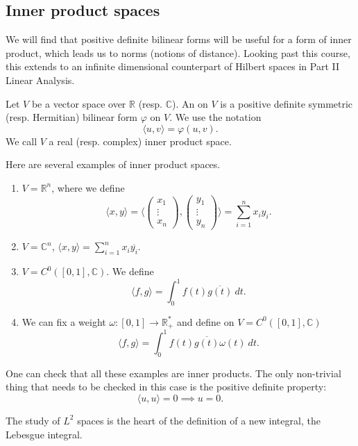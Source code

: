 \documentclass[a4paper]{scrartcl}
\begin{document}
\subsection{Inner product spaces}
We will find that positive definite bilinear forms will be useful for a form of inner product, which leads us to norms (notions of distance). Looking past this course, this extends to an infinite dimensional counterpart of Hilbert spaces in Part II Linear Analysis.
\begin{definition}
      Let $V$ be a vector space over $\mathbb{R}$ (resp. $\mathbb{C}$). An  on $V$ is a positive definite symmetric (resp. Hermitian) bilinear form $\varphi$ on $V$. We use the notation 
      \[\langle u ,v \rangle =\varphi \left(u,v\right).\]
      We call $V$ a real (resp. complex) inner product space.
\end{definition}
\begin{example}
     Here are several examples of inner product spaces.
      \begin{enumerate}
           \item $V=\mathbb{R}^{n} $, where we define 
           \[\langle x ,y \rangle =\langle \begin{pmatrix}
           x_1\\\vdots\\x_n
           \end{pmatrix}, \begin{pmatrix}
           y_1\\\vdots\\y_n
           \end{pmatrix}\rangle
           =\sum_{i=1}^{n}x_i y_i
           .\]
           \item $V=\mathbb{C}^n$, $\langle x ,y \rangle =\sum_{i=1}^{n}x_i \overline{y_i} $.
           \item $V=C^{0} \left([0,1],\mathbb{C}\right)$. We define 
           \[\langle f,g \rangle =\int_{0}^{1}f \left(t\right)\overline{g \left(t\right)} \ dt.\]
           \item We can fix a weight $\omega: [0,1] \rightarrow \mathbb{R}^*_+$ and define on $V=C^{0} \left([0,1],\mathbb{C}\right)$ 
           \[\langle f,g \rangle =\int_{0}^{1}f \left(t\right)\overline{g \left(t\right)} \omega \left(t\right) \ dt.\]
      \end{enumerate}
      One can check that all these examples are inner products. The only non-trivial thing that needs to be checked in this case is the positive definite property: 
      \[\langle u,u \rangle =0 \implies u=0.\]
\end{example}
\begin{remark}
      The study of $L^2$ spaces is the heart of the definition of a new integral, the Lebesgue integral.
\end{remark}
\end{document}
